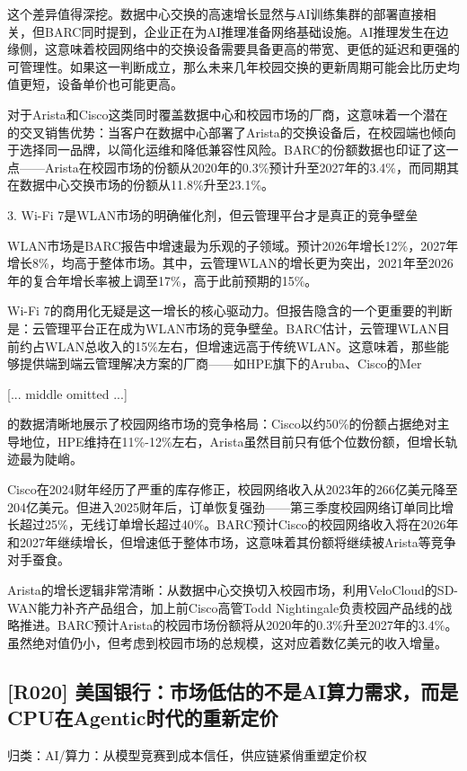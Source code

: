 \documentclass[11pt]{ctexart}
\begin{document}
这个差异值得深挖。数据中心交换的高速增长显然与AI训练集群的部署直接相关，但BARC同时提到，企业正在为AI推理准备网络基础设施。AI推理发生在边缘侧，这意味着校园网络中的交换设备需要具备更高的带宽、更低的延迟和更强的可管理性。如果这一判断成立，那么未来几年校园交换的更新周期可能会比历史均值更短，设备单价也可能更高。

对于Arista和Cisco这类同时覆盖数据中心和校园市场的厂商，这意味着一个潜在的交叉销售优势：当客户在数据中心部署了Arista的交换设备后，在校园端也倾向于选择同一品牌，以简化运维和降低兼容性风险。BARC的份额数据也印证了这一点——Arista在校园市场的份额从2020年的0.3\%预计升至2027年的3.4\%，而同期其在数据中心交换市场的份额从11.8\%升至23.1\%。

3. Wi-Fi 7是WLAN市场的明确催化剂，但云管理平台才是真正的竞争壁垒

WLAN市场是BARC报告中增速最为乐观的子领域。预计2026年增长12\%，2027年增长8\%，均高于整体市场。其中，云管理WLAN的增长更为突出，2021年至2026年的复合年增长率被上调至17\%，高于此前预期的15\%。

Wi-Fi 7的商用化无疑是这一增长的核心驱动力。但报告隐含的一个更重要的判断是：云管理平台正在成为WLAN市场的竞争壁垒。BARC估计，云管理WLAN目前约占WLAN总收入的15\%左右，但增速远高于传统WLAN。这意味着，那些能够提供端到端云管理解决方案的厂商——如HPE旗下的Aruba、Cisco的Mer

[... middle omitted ...]

的数据清晰地展示了校园网络市场的竞争格局：Cisco以约50\%的份额占据绝对主导地位，HPE维持在11\%-12\%左右，Arista虽然目前只有低个位数份额，但增长轨迹最为陡峭。

Cisco在2024财年经历了严重的库存修正，校园网络收入从2023年的266亿美元降至204亿美元。但进入2025财年后，订单恢复强劲——第三季度校园网络订单同比增长超过25\%，无线订单增长超过40\%。BARC预计Cisco的校园网络收入将在2026年和2027年继续增长，但增速低于整体市场，这意味着其份额将继续被Arista等竞争对手蚕食。

Arista的增长逻辑非常清晰：从数据中心交换切入校园市场，利用VeloCloud的SD-WAN能力补齐产品组合，加上前Cisco高管Todd Nightingale负责校园产品线的战略推进。BARC预计Arista的校园市场份额将从2020年的0.3\%升至2027年的3.4\%。虽然绝对值仍小，但考虑到校园市场的总规模，这对应着数亿美元的收入增量。

\subsection{[R020] 美国银行：市场低估的不是AI算力需求，而是CPU在Agentic时代的重新定价}
{\small\color{refgray}归类：AI/算力：从模型竞赛到成本信任，供应链紧俏重塑定价权}
\end{document}

